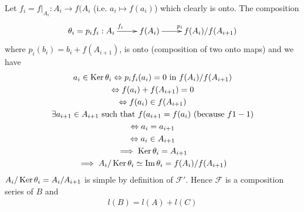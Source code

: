 Let \(f_i = f|_{A_i}:A_i\rightarrow f(A_i\) (i.e. \(a_i\mapsto
f(a_i)\)) which clearly is onto. The composition 
\begin{align*}
    \xymatrix{\theta_i = p_if_i:A_i\ar[r]^{f_i} & f(A_i)\ar[r]^{p_i} & f(A_i)/f(A_{i+1})}
\end{align*}
where \(p_i(b_i) = b_i + f(A_{i+1})\), is onto (composition of two onto maps) and we have
\begin{gather*}
    a_i\in\operatorname{Ker}\nolimits \theta_i \Leftrightarrow p_if_i(a_i) = 0 \text{ in } f(A_i)/f(A_{i+1})\\
    \Leftrightarrow f(a_i) + f(A_{i+1}) = 0\\
    \Leftrightarrow f(a_i)\in f(A_{i+1})\\
    \exists a_{i+1}\in A_{i+1}\text{ such that } f(a_{i+1} = f(a_i) \text{   (because } f 1-1)\\
    \Leftrightarrow a_i = a_{i+1}\\
    \Leftrightarrow a_i\in A_{i+1}\\
    \implies \operatorname{Ker}\nolimits\theta_i = A_{i+1}\\
    \implies A_i/\operatorname{Ker}\nolimits\theta_i \simeq \operatorname{Im}\nolimits\theta_i = f(A_i)/f(A_{i+1})
\end{gather*}
\(A_i/\operatorname{Ker}\nolimits\theta_i = A_i/A_{i+1}\) is simple by definition of \(\mathcal{F}'\). Hence \(\mathcal{F}\) is a composition series of \(B\) and
\begin{align*}
    l(B) = l(A) + l(C)
\end{align*}

